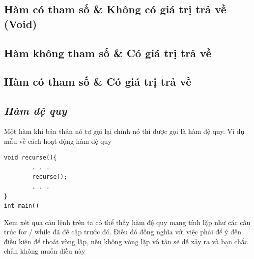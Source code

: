 \documentclass[12pt,a4paper]{article}
\begin{document}
\subsection{Hàm có tham số \& Không có giá trị trả về (Void)}
\subsection{Hàm không tham số \& Có giá trị trả về}
\subsection{Hàm có tham số \& Có giá trị trả về}

\begin{center}
\subsection*{\textit{Hàm đệ quy}} 	
\end{center}
Một hàm khi bản thân nó tự gọi lại chính nó thì được gọi là hàm đệ quy. Ví dụ mẫu về cách hoạt động hàm đệ quy
\begin{lstlisting}
void recurse(){
		. . .
		recurse();
		. . .
}
int main()
\end{lstlisting}
Xem xét qua câu lệnh trên ta có thể thấy hàm đệ quy mang tính lặp như các cấu trúc for / while đã đề cập trước đó. Điều đó đồng nghĩa với việc phải để ý đến điều kiện để thoát vòng lặp, nếu không vòng lặp vô tận sẽ dễ xảy ra và bạn chắc chắn không muốn điều này
\end{document}
